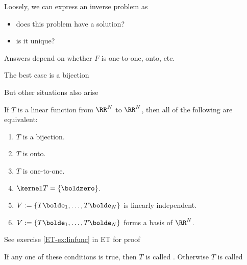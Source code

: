 \begin{frame}
    
    \vspace{2em}
    Loosely, we can express an inverse problem as
    
    \begin{figure}
       \begin{center}
        \scalebox{.5}{}
       \end{center}
    \end{figure}

    \begin{itemize}
        \item does this problem have a solution?
        \item is it unique?
    \end{itemize}

    Answers depend on whether $F$ is one-to-one, onto, etc.

    The best case is a bijection

    But other situations also arise

\end{frame}

\begin{frame}

    \vspace{2em}
    \Thm {\eqref{ET-t:linfunc}}
        If $T$ is a linear function from $\RR^N$ to $\RR^N$, then all of the
        following are equivalent:
        \begin{enumerate}
            \item $T$ is a bijection.
            \item $T$ is onto.
            \item $T$ is one-to-one.
            \item $\kernel T = \{ \boldzero \}$.
            \item $V := \{T\bolde_1, \ldots, T\bolde_N\}$ is
                linearly independent.
            \item $V := \{T\bolde_1, \ldots, T\bolde_N\}$ forms a basis of
                $\RR^N$.
        \end{enumerate}
    See exercise \ref{ET-ex:linfunc} in ET for proof
    
    \vspace{.7em}
    If any one of these conditions is true, then $T$ is called
    . Otherwise $T$ is called 
    
\end{frame}

